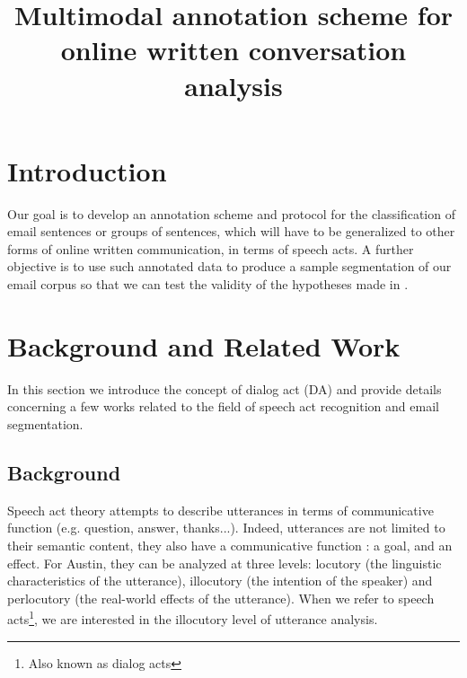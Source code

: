 \documentclass[11pt]{article}
\begin{document}
\title{Multimodal annotation scheme for online written conversation analysis}

\begin{titlepage}

\maketitle

\tableofcontents

\end{titlepage}

\section{Introduction}

Our goal is to develop an annotation scheme and protocol for the classification of email sentences or groups of sentences, which will have to be generalized to other forms of online written communication, in terms of speech acts. A further objective is to use such annotated data to produce a sample segmentation of our email corpus so that we can test the validity of the hypotheses made in \cite{hernandez2014exploiting}.

\section{Background and Related Work}

In this section we introduce the concept of dialog act (DA) and provide details concerning a few works related to the field of speech act recognition and email segmentation.

\subsection{Background}

Speech act theory \cite{austin1975things} attempts to describe utterances in terms of communicative function (e.g. question, answer, thanks...). Indeed, utterances are not limited to their semantic content, they also have a communicative function : a goal, and an effect. For Austin, they can be analyzed at three levels: locutory (the linguistic characteristics of the utterance), illocutory (the intention of the speaker) and perlocutory (the real-world effects of the utterance). When we refer to speech acts\footnote{Also known as dialog acts}, we are interested in the illocutory level of utterance analysis. 
\end{document}
